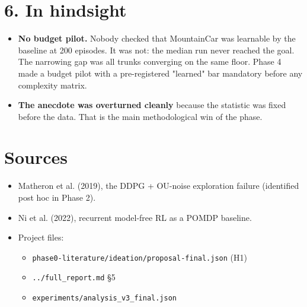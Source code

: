 \documentclass[11pt]{article}
\begin{document}
\section*{6. In hindsight}



\begin{itemize}
\item \textbf{No budget pilot.} Nobody checked that MountainCar was learnable by the baseline at 200 episodes. It was not: the median run never reached the goal. The narrowing gap was all trunks converging on the same floor. Phase 4 made a budget pilot with a pre-registered "learned" bar mandatory before any complexity matrix.
\item \textbf{The anecdote was overturned cleanly} because the statistic was fixed before the data. That is the main methodological win of the phase.
\end{itemize}



\section*{Sources}



\begin{itemize}
\item Matheron et al. (2019), the DDPG + OU-noise exploration failure (identified post hoc in Phase 2).
\item Ni et al. (2022), recurrent model-free RL as a POMDP baseline.
\item Project files:
\begin{itemize}
\item \texttt{phase0-literature/\allowbreak{}ideation/\allowbreak{}proposal-final.\allowbreak{}json} (H1)
\item \texttt{.\allowbreak{}.\allowbreak{}/\allowbreak{}full\_\allowbreak{}report.\allowbreak{}md} \S{}5
\item \texttt{experiments/\allowbreak{}analysis\_\allowbreak{}v3\_\allowbreak{}final.\allowbreak{}json}
\end{itemize}
\end{itemize}
\end{document}
